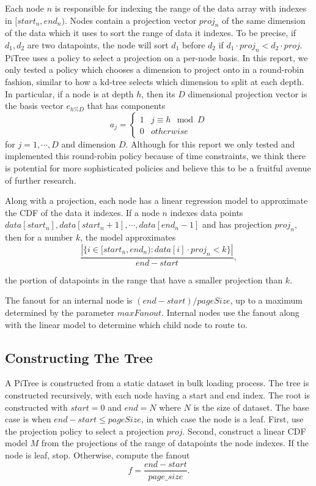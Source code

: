 \documentclass[sigconf,10pt]{acmart}
\begin{document}
Each node $n$ is responsible for indexing the range of the data array with indexes in $[start_n, end_n)$.
Nodes contain a projection vector $proj_n$ of the same dimension of the data
which it uses to sort the range of data it indexes. 
To be precise, if $d_1, d_2$ are two datapoints, the node will 
sort $d_1$ before $d_2$ if $d_1 \cdot proj_n < d_2 \cdot proj$.
PiTree uses a policy to select a projection on a per-node basis. In this report,
we only tested a policy which chooses a dimension to project onto in a round-robin
fashion, similar to how a kd-tree selects which dimension to split at each depth.
In particular, if a node is at depth $h$, then its
$D$ dimensional projection vector is the basis vector $e_{h \% D}$ that has components 
$$a_j = \begin{cases} 
  1 & j \equiv h \mod D \\
  0 & otherwise
\end{cases}
$$
for $j=1, \cdots, D$ and dimension $D$. Although for this report we only 
tested and implemented this round-robin policy because of time constraints,
we think there is potential
for more sophisticated policies and believe this to be a fruitful avenue of further
research.

Along with a projection, each node has a linear regression model 
to approximate the CDF of the data it indexes. If a node $n$ indexes data points
$data[start_n], data[start_n + 1], \cdots, data[end_n - 1]$ and has projection $proj_n$,
then for a number $k$, the
model approximates
\[ 
  \frac{|\{i \in [start_n, end_n) : data[i] \cdot proj_n < k\}|}{end - start},
\]

the portion of datapoints in the range that have a 
smaller projection than $k$.

The fanout for an internal node is $(end - start) / pageSize$, up to a maximum determined
by the parameter $maxFanout$. Internal nodes use the fanout along with the linear model
to determine which child node to route to.

\subsection{Constructing The Tree}

A PiTree is constructed from a static dataset in bulk loading process.
The tree is constructed recursively, with each node having a start and 
end index. The root is constructed with $start=0$ and $end=N$ where $N$
is the size of dataset. The base case is when $end - start \leq pageSize$,
in which case the node is a leaf.
First, use the projection policy to select a projection $proj$.
Second, construct a linear CDF model $M$ from the projections of the range of datapoints
the node indexes. If the node is leaf, stop. Otherwise,
compute the fanout 
\[
  f = \frac{end - start}{page\_size}.
\]
\end{document}
